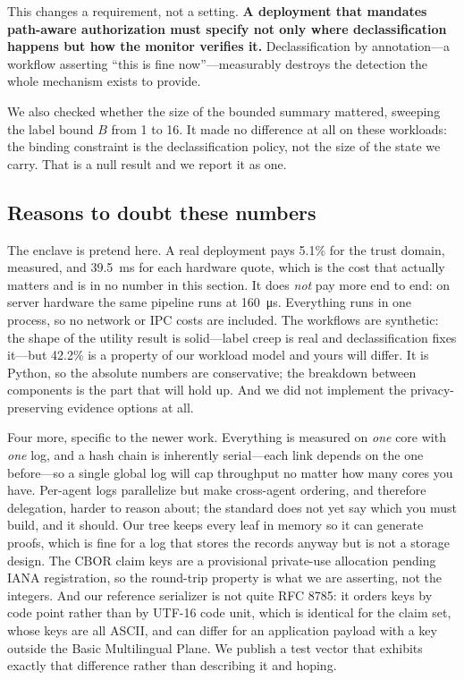 \documentclass[11pt]{article}
\begin{document}
This changes a requirement, not a setting. \textbf{A deployment that mandates
path-aware authorization must specify not only where declassification happens
but how the monitor verifies it.} Declassification by annotation---a workflow
asserting ``this is fine now''---measurably destroys the detection the whole
mechanism exists to provide.

We also checked whether the size of the bounded summary mattered, sweeping the
label bound $B$ from 1 to 16. It made no difference at all on these workloads:
the binding constraint is the declassification policy, not the size of the
state we carry. That is a null result and we report it as one.

\subsection{Reasons to doubt these numbers}
The enclave is pretend here. A real deployment pays 5.1\% for the trust domain,
measured, and \SI{39.5}{\milli\second} for each hardware quote, which is the
cost that actually matters and is in no number in this section. It does
\emph{not} pay more end to end: on server hardware the same pipeline runs at
\SI{160}{\micro\second}. Everything runs in one process, so no network or IPC
costs are included. The workflows are synthetic: the shape of the utility
result is solid---label creep is real and declassification fixes it---but
42.2\% is a property of our workload model and yours will differ. It is
Python, so the absolute numbers are conservative; the breakdown between
components is the part that will hold up. And we did not implement the
privacy-preserving evidence options at all.

Four more, specific to the newer work. Everything is measured on \emph{one}
core with \emph{one} log, and a hash chain is inherently serial---each link
depends on the one before---so a single global log will cap throughput no
matter how many cores you have. Per-agent logs parallelize but make cross-agent
ordering, and therefore delegation, harder to reason about; the standard does
not yet say which you must build, and it should. Our tree keeps every leaf in
memory so it can generate proofs, which is fine for a log that stores the
records anyway but is not a storage design. The CBOR claim keys are a
provisional private-use allocation pending IANA registration, so the round-trip
property is what we are asserting, not the integers. And our reference
serializer is not quite RFC 8785: it orders keys by code point rather than by
UTF-16 code unit, which is identical for the claim set, whose keys are all
ASCII, and can differ for an application payload with a key outside the Basic
Multilingual Plane. We publish a test vector that exhibits exactly that
difference rather than describing it and hoping.
\end{document}
